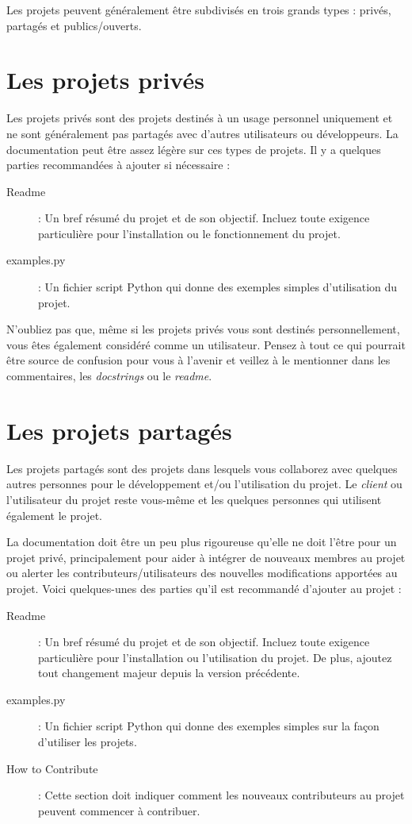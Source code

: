 \documentclass[a4paper,12pt]{book}
\begin{document}
Les projets peuvent généralement être subdivisés en trois grands types : privés, partagés et publics/ouverts.
\medskip

\section{Les projets privés}
Les projets privés sont des projets destinés à un usage personnel uniquement et ne sont généralement pas partagés avec d'autres utilisateurs ou développeurs. La documentation peut être assez légère sur ces types de projets. Il y a quelques parties recommandées à ajouter si nécessaire :
\begin{description}
	\item[Readme] : Un bref résumé du projet et de son objectif. Incluez toute exigence particulière pour l'installation ou le fonctionnement du projet.
	\item[examples.py] : Un fichier script Python qui donne des exemples simples d'utilisation du projet.
\end{description}
\medskip

N'oubliez pas que, même si les projets privés vous sont destinés personnellement, vous êtes également considéré comme un utilisateur. Pensez à tout ce qui pourrait être source de confusion pour vous à l'avenir et veillez à le mentionner dans les commentaires, les \textit{docstrings} ou le \textit{readme}.
\medskip

\section{Les projets partagés}
Les projets partagés sont des projets dans lesquels vous collaborez avec quelques autres personnes pour le développement et/ou l'utilisation du projet. Le \og \textit{client}\fg{} ou l'utilisateur du projet reste vous-même et les quelques personnes qui utilisent également le projet.
\medskip

La documentation doit être un peu plus rigoureuse qu'elle ne doit l'être pour un projet privé, principalement pour aider à intégrer de nouveaux membres au projet ou alerter les contributeurs/utilisateurs des nouvelles modifications apportées au projet. Voici quelques-unes des parties qu'il est recommandé d'ajouter au projet :
\begin{description}
	\item[Readme] : Un bref résumé du projet et de son objectif. Incluez toute exigence particulière pour l'installation ou l'utilisation du projet. De plus, ajoutez tout changement majeur depuis la version précédente.
	\item[examples.py] : Un fichier script Python qui donne des exemples simples sur la façon d'utiliser les projets.
	\item[How to Contribute] : Cette section doit indiquer comment les nouveaux contributeurs au projet peuvent commencer à contribuer.
\end{description}
\medskip
\end{document}
